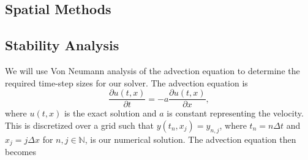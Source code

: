 \subsection{Spatial Methods}




\subsection{Stability Analysis}

We will use Von Neumann analysis of the advection equation to determine the required time-step sizes for our solver. The advection equation is
\begin{equation}
    \frac{\partial u(t,x)}{\partial t} = -a \frac{\partial u(t,x)}{\partial x},
\end{equation}
where $u(t,x)$ is the exact solution and $a$ is constant representing the velocity. This is discretized over a grid such that $y(t_n,x_j)=y_{n,j}$, where $t_n = n\Delta t$ and $x_j = j\Delta x$ for $n,j\in\mathbb{N}$, is our numerical solution. The advection equation then becomes

